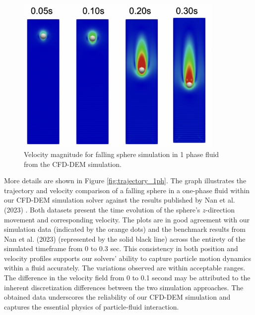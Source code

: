 \begin{figure}[!ht]
    \centering
    \includegraphics[width=10cm]{Images/chap3/1ph_exp_me.png}
    \caption{Velocity magnitude for falling sphere simulation in 1 phase fluid from the CFD-DEM simulation.}
    \label{fig:1ph_exp_me}
\end{figure}

More details are shown in Figure \ref{fig:trajectory_1ph}. The graph illustrates the trajectory and velocity comparison of a falling sphere in a one-phase fluid within our CFD-DEM simulation solver against the results published by Nan et al. (2023) \cite{nan2023high}. Both datasets present the time evolution of the sphere's $z$-direction movement and corresponding velocity. The plots are in good agreement with our simulation data (indicated by the orange dots) and the benchmark results from Nan et al. (2023)\cite{nan2023high} (represented by the solid black line) across the entirety of the simulated timeframe from 0 to 0.3 sec. This consistency in both position and velocity profiles supports our solvers' ability to capture particle motion dynamics within a fluid accurately. The variations observed are within acceptable ranges. The difference in the velocity field from 0 to 0.1 second may be attributed to the inherent discretization differences between the two simulation approaches. The obtained data underscores the reliability of our CFD-DEM simulation and captures the essential physics of particle-fluid interaction.

